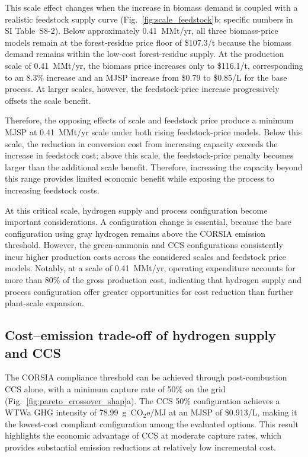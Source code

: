 This scale effect changes when the increase in biomass demand is coupled with a realistic feedstock supply curve (Fig.~\ref{fig:scale_feedstock}b; specific numbers in SI Table~S8-2). Below approximately 0.41~MMt/yr, all three biomass-price models remain at the forest-residue price floor of \$107.3/t because the biomass demand remains within the low-cost forest-residue supply. At the production scale of 0.41~MMt/yr, the biomass price increases only to \$116.1/t, corresponding to an 8.3\% increase and an MJSP increase from \$0.79 to \$0.85/L for the base process. At larger scales, however, the feedstock-price increase progressively offsets the scale benefit.  

Therefore, the opposing effects of scale and feedstock price produce a minimum MJSP at 0.41~MMt/yr scale under both rising feedstock-price models. Below this scale, the reduction in conversion cost from increasing capacity exceeds the increase in feedstock cost; above this scale, the feedstock-price penalty becomes larger than the additional scale benefit. Therefore, increasing the capacity beyond this range provides limited economic benefit while exposing the process to increasing feedstock costs. 

At this critical scale, hydrogen supply and process configuration become important considerations. A configuration change is essential, because the base configuration using gray hydrogen remains above the CORSIA emission threshold. However, the green-ammonia and CCS configurations consistently incur higher production costs across the considered scales and feedstock price models. Notably, at a scale of 0.41~MMt/yr, operating expenditure accounts for more than 80\% of the gross production cost, indicating that hydrogen supply and process configuration offer greater opportunities for cost reduction than further plant-scale expansion.

\subsection{Cost--emission trade-off of hydrogen supply and CCS}
\label{sec:h2_ccs_tradeoff}

The CORSIA compliance threshold can be achieved through post-combustion CCS alone, with a minimum capture rate of 50\% on the grid (Fig.~\ref{fig:pareto_crossover_shap}a). The CCS 50\% configuration achieves a WTWa GHG intensity of 78.99~g~CO$_2$e/MJ at an MJSP of \$0.913/L, making it the lowest-cost compliant configuration among the evaluated options. This result highlights the economic advantage of CCS at moderate capture rates, which provides substantial emission reductions at relatively low incremental cost.

